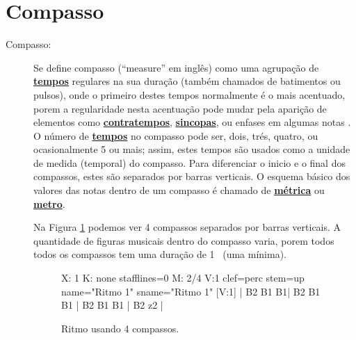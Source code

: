 \section{Compasso}
\label{sec:compaso}

\begin{description}
\item[Compasso:] \label{def:Compasso} Se define compasso (``measure'' em inglês)
como uma agrupação de \hyperref[sec:Tempo]{\textbf{tempos}} regulares na sua duração (também chamados de batimentos ou pulsos),
onde o primeiro destes tempos normalmente é o mais acentuado,
porem a regularidade nesta acentuação pode mudar pela aparição de elementos como \hyperref[sec:contratempo]{\textbf{contratempos}}, 
\hyperref[sec:sincopa]{\textbf{sincopas}}, ou enfases em algumas notas  \cite[pp. 513]{apel1969harvard}. 
O número de \hyperref[sec:Tempo]{\textbf{tempos}} no compasso pode ser, dois, trés, quatro, ou ocasionalmente 5 ou mais;
assim, estes tempos são usados como a unidade de medida (temporal) do compasso.
Para diferenciar o inicio e o final dos compassos, 
estes são separados por barras verticais. 
O esquema básico dos valores das notas dentro de um compasso é chamado de \hyperref[def:Metrica]{\textbf{métrica}}  ou \hyperref[def:Metrica]{\textbf{metro}}.
\begin{example}
Na Figura \ref{fig:abc-exemplocompasso1} podemos ver 4 compassos separados por barras verticais.
A quantidade de figuras musicais dentro do compasso varia, 
porem todos todos os compassos tem uma duração de  1 \Halb~(uma mínima).
\end{example}
 
\begin{figure}[h]
\centering
\begin{abc}[name=abc-exemplocompasso1]
%
X: 1 %
K: none stafflines=0 %
M: 2/4
V:1 clef=perc stem=up name="Ritmo 1"   sname="Ritmo 1"
%
[V:1] | B2 B1 B1| B2 B1 B1 | B2 B1 B1 | B2 z2  |
%       
\end{abc}
\caption{Ritmo usando 4 compassos.}
\label{fig:abc-exemplocompasso1}
\end{figure}


\end{description}
